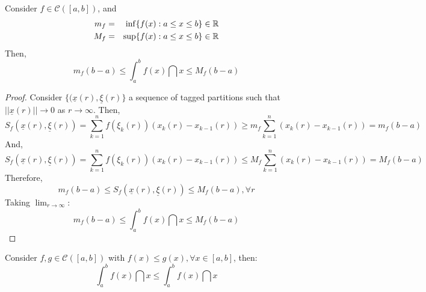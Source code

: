 \begin{theorem}
    Consider $f \in \mathcal{C}([a,b])$, and
    \begin{eqnarray*}
        m_f &=& \inf \{ f(x) : a \leq x \leq b \} \in \mathbb{R} \\
        M_f &=& \sup \{ f(x) : a \leq x \leq b \} \in \mathbb{R} \\
    \end{eqnarray*}
    Then,
    \begin{equation*}
        m_f(b-a) \leq \int_a^b f(x)\dint x \leq M_f(b-a)
    \end{equation*}
\end{theorem}

\begin{proof}
    Consider $\{ (\underline{x}(r), \underline{\xi}(r)\}$ a sequence of tagged partitions such that $|| \underline{x}(r) || \to 0$ as $r \to \infty$. Then,
    \begin{equation*}
        S_f(\underline{x}(r), \underline{\xi}(r)) = \sum \limits_{k=1}^n f(\xi_k(r))(x_k(r) - x_{k-1}(r)) \geq m_f \sum \limits_{k=1}^n (x_k(r) - x_{k-1}(r)) = m_f(b-a)
    \end{equation*}
    And,
    \begin{equation*}
        S_f(\underline{x}(r), \underline{\xi}(r)) = \sum \limits_{k=1}^n f(\xi_k(r))(x_k(r) - x_{k-1}(r)) \leq M_f \sum \limits_{k=1}^n (x_k(r) - x_{k-1}(r)) = M_f(b-a)
    \end{equation*}
    Therefore,
    \begin{equation*}
        m_f(b-a) \leq S_f(\underline{x}(r), \underline{\xi}(r)) \leq M_f(b-a), \forall r
    \end{equation*}
    Taking $\lim_{r \to \infty}$:
    \begin{equation*}
        m_f(b-a) \leq \int_a^b f(x) \dint x \leq M_f(b-a)
    \end{equation*}
\end{proof}

\begin{theorem}
    Consider $f, g \in \mathcal{C}([a,b])$ with $f(x) \leq g(x), \forall x \in [a,b]$, then:
    \begin{equation*}
        \int_a^b f(x) \dint x \leq \int_a^b f(x) \dint x
    \end{equation*}
\end{theorem}

